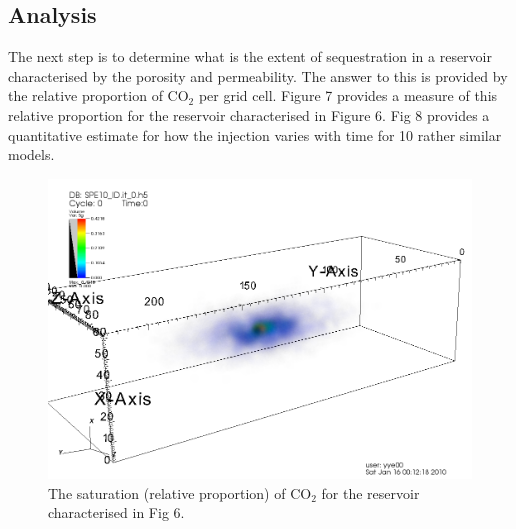 \documentclass{rspublic}
\begin{document}
\subsection{Analysis} 

The next step is to determine what is the extent of sequestration in a
reservoir characterised by the porosity and permeability.  The answer
to this is provided by the relative proportion of CO$_2$ per grid
cell. Figure 7 provides a measure of this relative proportion for the 
reservoir characterised in Figure 6. Fig 8 provides a quantitative
estimate for how the injection varies with time for 10 rather similar
models. 

\begin{figure}
\begin{center}
\includegraphics[scale=0.2]{figures/visit0001.png} 
\end{center}
\caption[Simulation Output]{The saturation (relative proportion) of
  CO$_2$ for the reservoir characterised in Fig 6.}
\label{}
\end{figure}
\end{document}
